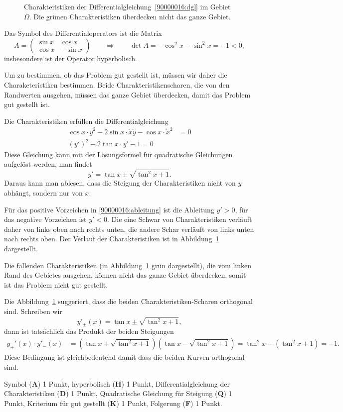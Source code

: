 \begin{loesung}
\begin{figure}
\centering
{}
\caption{Charakteristiken der Differentialgleichung~\eqref{90000016:dgl}
im Gebiet $\Omega$.
Die grünen Charakteristiken überdecken nicht das ganze Gebiet.
\label{90000016:char}}
\end{figure}
Das Symbol des Differentialoperators  ist die Matrix
\[
A
=
\begin{pmatrix} \sin x & \cos x\\ \cos x & -\sin x \end{pmatrix}
\qquad\Rightarrow\qquad
\det A
=
-\cos^2 x -\sin^2 x = -1 < 0,
\]
insbesondere ist der Operator hyperbolisch.

Um zu bestimmen, ob das Problem gut gestellt ist, müssen wir daher die
Charaketeristiken bestimmen.
Beide Charakteristikenscharen, die von den Randwerten ausgehen, müssen das
ganze Gebiet überdecken, damit das Problem gut gestellt ist.

Die Charakteristiken erfüllen die Differentialgleichung
\begin{align*}
\cos x \cdot \dot y^2
-
2\sin x\cdot \dot x \dot y
-
\cos x \cdot \dot x^2
&=
0
\\
(y')^2
-2\tan x\cdot y'
-1
=
0
\end{align*}
Diese Gleichung kann mit der Lösungsformel für quadratische Gleichungen
aufgelöst werden, man findet
\begin{equation}
y' = \tan x\pm \sqrt{\tan^2 x+1}.
\label{90000016:ableitung}
\end{equation}
Daraus kann man ablesen, dass die Steigung der Charakteristiken nicht von
$y$ abhängt, sondern nur von $x$.

Für das positive Vorzeichen in \eqref{90000016:ableitung} ist die
Ableitung $y' > 0$, für das negative Vorzeichen ist $y'<0$.
Die eine Schwar von Charakteristiken verläuft daher von links oben
nach rechts unten, die andere Schar verläuft von links unten nach
rechts oben.
Der Verlauf der Charakteristiken ist in Abbildung~\ref{90000016:char}
dargestellt.

Die fallenden Charakteristiken (in Abbildung~\ref{90000016:char} grün
dargestellt), die vom linken Rand des Gebietes
ausgehen, können nicht das ganze Gebiet überdecken, somit ist das
Problem nicht gut gestellt.
\end{loesung}

\begin{diskussion}
Die Abbildung~\ref{90000016:char} suggeriert, dass die beiden
Charakteristiken-Scharen orthogonal sind.
Schreiben wir
\[
y'_\pm(x)
=
\tan x\pm \sqrt{\tan^2 x+1},
\]
dann ist tatsächlich das Produkt der beiden Steigungen
\begin{align*}
y_+'(x)\cdot y'_-(x)
&=
(\tan x + \sqrt{\tan^2 x+1})
(\tan x - \sqrt{\tan^2 x+1})
=
\tan^2x - (\tan^2x+1)
=
-1.
\end{align*}
Diese Bedingung ist gleichbedeutend damit dass die beiden Kurven
orthogonal sind.
\end{diskussion}

\begin{bewertung}
Symbol ({\bf A}) 1 Punkt,
hyperbolisch ({\bf H}) 1 Punkt,
Differentialgleichung der Charakteristiken ({\bf D}) 1 Punkt,
Quadratische Gleichung für Steigung ({\bf Q}) 1 Punkt,
Kriterium für gut gestellt ({\bf K}) 1 Punkt,
Folgerung ({\bf F}) 1 Punkt.
\end{bewertung}

